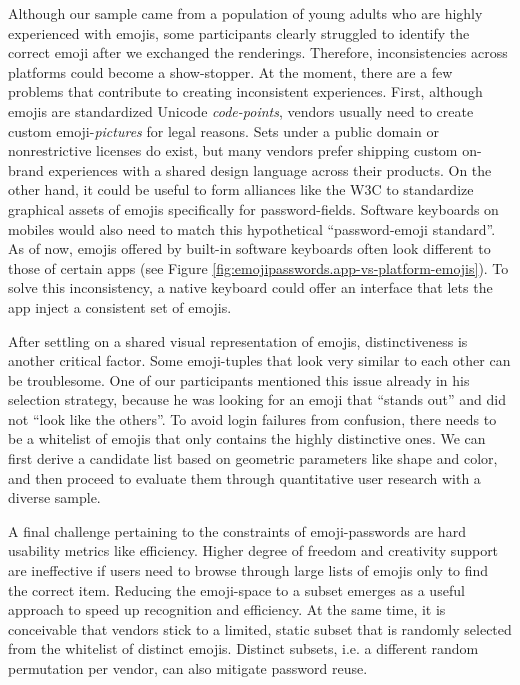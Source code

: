 Although our sample came from a population of young adults who are highly experienced with emojis, some participants clearly struggled to identify the correct emoji after we exchanged the renderings. Therefore, inconsistencies across platforms could become a show-stopper. At the moment, there are a few problems that contribute to creating inconsistent experiences. 
First, although emojis are standardized Unicode \textit{code-points}, vendors usually need to create custom emoji-\textit{pictures} for legal reasons. Sets under a public domain or nonrestrictive licenses do exist, but many vendors prefer shipping custom on-brand experiences with a shared design language across their products. On the other hand, it could be useful to form alliances like the \gls{W3C} to standardize graphical assets of emojis specifically for password-fields. Software keyboards on mobiles would also need to match this hypothetical ``password-emoji standard''. As of now, emojis offered by built-in software keyboards often look different to those of certain apps (see Figure \ref{fig:emojipasswords.app-vs-platform-emojis}). To solve this inconsistency, a native keyboard could offer an interface that lets the app inject a consistent set of emojis.

After settling on a shared visual representation of emojis, distinctiveness is another critical factor. Some emoji-tuples that look very similar to each other can be troublesome. One of our participants mentioned this issue already in his selection strategy, because he was looking for an emoji that ``stands out'' and did not ``look like the others''. To avoid login failures from confusion, there needs to be a whitelist of emojis that only contains the highly distinctive ones. We can first derive a candidate list based on geometric parameters like shape and color, and then proceed to evaluate them through quantitative user research with a diverse sample.

A final challenge pertaining to the constraints of emoji-passwords are hard usability metrics like efficiency. Higher degree of freedom and creativity support are ineffective if users need to browse through large lists of emojis only to find the correct item. Reducing the emoji-space to a subset emerges as a useful approach to speed up recognition and efficiency. At the same time, it is conceivable that vendors stick to a limited, static subset that is randomly selected from the whitelist of distinct emojis. Distinct subsets, i.e. a different random permutation per vendor, can also mitigate password reuse. 

